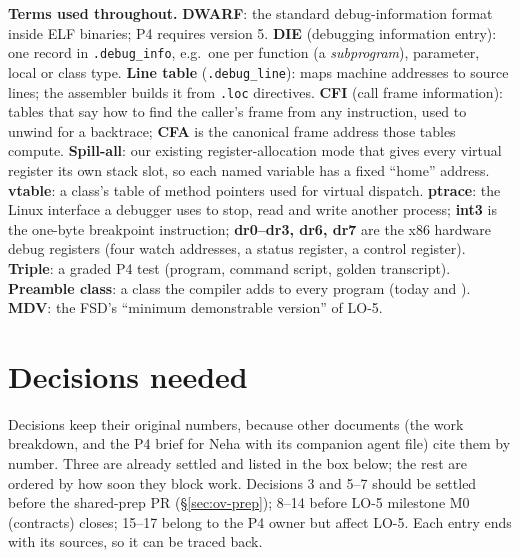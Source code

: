 \documentclass[10pt]{article}
\newcommand{\code}[1]{\texttt{\small #1}}
\begin{document}
\textbf{Terms used throughout.}
\textbf{DWARF}: the standard debug-information format inside ELF binaries; P4 requires version 5.
\textbf{DIE} (debugging information entry): one record in \code{.debug\_info}, e.g.\ one per function (a \emph{subprogram}), parameter, local or class type.
\textbf{Line table} (\code{.debug\_line}): maps machine addresses to source lines; the assembler builds it from \code{.loc} directives.
\textbf{CFI} (call frame information): tables that say how to find the caller's frame from any instruction, used to unwind for a backtrace; \textbf{CFA} is the canonical frame address those tables compute.
\textbf{Spill-all}: our existing register-allocation mode that gives every virtual register its own stack slot, so each named variable has a fixed ``home'' address.
\textbf{vtable}: a class's table of method pointers used for virtual dispatch.
\textbf{ptrace}: the Linux interface a debugger uses to stop, read and write another process; \textbf{int3} is the one-byte breakpoint instruction; \textbf{dr0--dr3, dr6, dr7} are the x86 hardware debug registers (four watch addresses, a status register, a control register).
\textbf{Triple}: a graded P4 test (program, command script, golden transcript).
\textbf{Preamble class}: a class the compiler adds to every program (today  and ).
\textbf{MDV}: the FSD's ``minimum demonstrable version'' of LO-5.

\section{Decisions needed}\label{sec:decisions}
Decisions keep their original numbers, because other documents (the work breakdown, and the P4 brief for Neha with its companion agent file) cite them by number. Three are already settled and listed in the box below; the rest are ordered by how soon they block work. Decisions 3 and 5--7 should be settled before the shared-prep PR (\S\ref{sec:ov-prep}); 8--14 before LO-5 milestone M0 (contracts) closes; 15--17 belong to the P4 owner but affect LO-5. Each entry ends with its sources, so it can be traced back.
\end{document}
